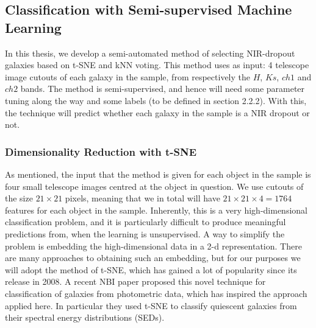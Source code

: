 \subsection{Classification with Semi-supervised Machine Learning}
In this thesis, we develop a semi-automated method of selecting NIR-dropout galaxies based on t-SNE \cite{Maaten_2008_tSNE} and kNN voting. This method uses as input: 4 telescope image cutouts of each galaxy in the sample, from respectively the $H$, $Ks$, $ch1$ and $ch2$ bands. The method is semi-supervised, and hence will need some parameter tuning along the way and some labels (to be defined in section 2.2.2). With this, the technique will predict whether each galaxy in the sample is a NIR dropout or not.

\subsubsection{Dimensionality Reduction with t-SNE}
As mentioned, the input that the method is given for each object in the sample is four small telescope images centred at the object in question. We use cutouts of the size $21\!\times\!21$ pixels, meaning that we in total will have $21\times21\times4=1764$ features for each object in the sample. Inherently, this is a very high-dimensional classification problem, and it is particularly difficult to produce meaningful predictions from, when the learning is unsupervised. A way to simplify the problem is embedding the high-dimensional data in a 2-d representation. There are many approaches to obtaining such an embedding, but for our purposes we will adopt the method of t-SNE, which has gained a lot of popularity since its release in 2008. A recent NBI paper \cite{Steinhardt_2020} proposed this novel technique for classification of galaxies from photometric data, which has inspired the approach applied here. In particular they used t-SNE to classify quiescent galaxies from their spectral energy distributions (SEDs). \\

